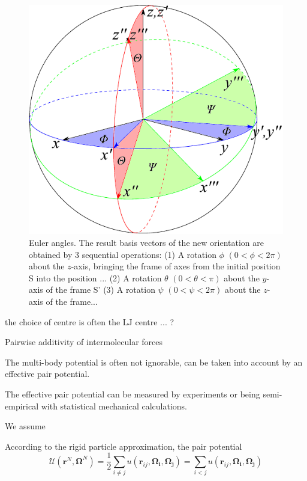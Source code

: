 \begin{figure}[h]
\begin{centering}
\includegraphics[scale=0.7]{_figure/euler_sphere}
\par\end{centering}

\caption[Euler angles]{Euler angles. The result basis vectors of the new orientation are
obtained by 3 sequential operations: (1) A rotation $\phi$ $(0<\phi<2\pi)$
about the $z$-axis, bringing the frame of axes from the initial position
S into the position ... (2) A rotation $\theta$ $(0<\theta<\pi)$
about the $y$-axis of the frame S' (3) A rotation $\psi$ $(0<\psi<2\pi)$
about the $z$-axis of the frame...\label{fig:Euler-angles}}
\end{figure}


the choice of centre is often the LJ centre ... ?

Pairwise additivity of intermolecular forces

The multi-body potential is often not ignorable, can be taken into
account by an effective pair potential.

The effective pair potential can be measured by experiments \citep{Gray-Gubbins}
or being semi-empirical with statistical mechanical calculations.

We assume 

According to the rigid particle approximation, the pair potential
\[
\mathcal{U}(\mathbf{r}^{N},\mathbf{\Omega}^{N})=\frac{1}{2}\sum_{i\neq j}u(\mathbf{r}_{ij},\mathbf{\Omega_{i}},\mathbf{\Omega_{j}})=\sum_{i<j}u(\mathbf{r}_{ij},\mathbf{\Omega_{i}},\mathbf{\Omega_{j}})
\]



